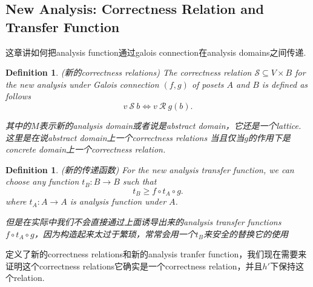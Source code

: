 \documentclass{article}
\newtheorem{definition}[theorem]{Definition}
\newcommand*{\xfunc}[4]{{#2}\colon{#3}{#1}{#4}}
\newcommand*{\func}[3]{\xfunc{\to}{#1}{#2}{#3}}
\begin{document}
\newpage
\subsection{New Analysis: Correctness Relation and Transfer Function}

{\color{red} 这章讲如何把analysis function通过galois connection在analysis domains之间传递}.

\begin{definition}
\rm {\color{red}(新的correctness relations)} The correctness relation $\mathcal{S} \subseteq V \times B$ for the new analysis under Galois connection $(f,g)$ of posets $A$ and $B$ is defined as follows
$$
v~\mathcal{S}~b \iff v~\mathcal{R}~g(b).
$$

{\color{red} 其中的$M$表示新的analysis domain或者说是abstract domain，它还是一个lattice}. {\color{blue} 这里是在说abstract domain上一个correctness relations 当且仅当$g$的作用下是concrete domain上一个correctness relation}.
\end{definition}


\begin{definition}
\rm {\color{red} (新的传递函数)} For the new analysis transfer function, we can choose any function $\func{t_B}{B}{B}$ such that
$$
t_B \geq f \circ t_A \circ g.
$$
where $\func{t_A}{A}{A}$ is analysis function under $A$.
\begin{center}
\end{center}
{\color{blue} 但是在实际中我们不会直接通过上面诱导出来的analysis transfer functions $f \circ t_A \circ g$，因为构造起来太过于繁琐，常常会用一个$t_B$来安全的替换它的使用}
\end{definition}



{\color{red} 定义了新的correctness relations和新的analysis tranfer function，我们现在需要来证明这个correctness relations它确实是一个correctness relation，并且$h'$下保持这个relation}.
\end{document}
